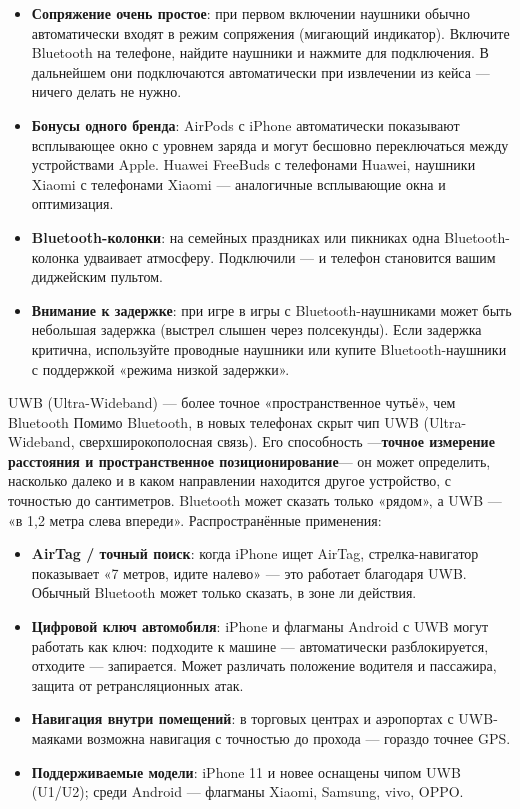 \begin{itemize}
  \item \textbf{Сопряжение очень простое}: при первом включении наушники обычно автоматически входят в режим сопряжения (мигающий индикатор). Включите Bluetooth на телефоне, найдите наушники и нажмите для подключения. В дальнейшем они подключаются автоматически при извлечении из кейса — ничего делать не нужно.
  \item \textbf{Бонусы одного бренда}: AirPods с iPhone автоматически показывают всплывающее окно с уровнем заряда и могут бесшовно переключаться между устройствами Apple. Huawei FreeBuds с телефонами Huawei, наушники Xiaomi с телефонами Xiaomi — аналогичные всплывающие окна и оптимизация.
  \item \textbf{Bluetooth-колонки}: на семейных праздниках или пикниках одна Bluetooth-колонка удваивает атмосферу. Подключили — и телефон становится вашим диджейским пультом.
  \item \textbf{Внимание к задержке}: при игре в игры с Bluetooth-наушниками может быть небольшая задержка (выстрел слышен через полсекунды). Если задержка критична, используйте проводные наушники или купите Bluetooth-наушники с поддержкой «режима низкой задержки».
\end{itemize}

\begin{tcbinfo}{UWB (Ultra-Wideband) — более точное «пространственное чутьё», чем Bluetooth}
Помимо Bluetooth, в новых телефонах скрыт чип UWB (Ultra-Wideband, сверхширокополосная связь). Его способность —\textbf{точное измерение расстояния и пространственное позиционирование}— он может определить, насколько далеко и в каком направлении находится другое устройство, с точностью до сантиметров. Bluetooth может сказать только «рядом», а UWB — «в 1,2 метра слева впереди». Распространённые применения:

\begin{itemize}
  \item \textbf{AirTag / точный поиск}: когда iPhone ищет AirTag, стрелка-навигатор показывает «7 метров, идите налево» — это работает благодаря UWB. Обычный Bluetooth может только сказать, в зоне ли действия.
  \item \textbf{Цифровой ключ автомобиля}: iPhone и флагманы Android с UWB могут работать как ключ: подходите к машине — автоматически разблокируется, отходите — запирается. Может различать положение водителя и пассажира, защита от ретрансляционных атак.
  \item \textbf{Навигация внутри помещений}: в торговых центрах и аэропортах с UWB-маяками возможна навигация с точностью до прохода — гораздо точнее GPS.
  \item \textbf{Поддерживаемые модели}: iPhone 11 и новее оснащены чипом UWB (U1/U2); среди Android — флагманы Xiaomi, Samsung, vivo, OPPO.
\end{itemize}

\end{tcbinfo}

